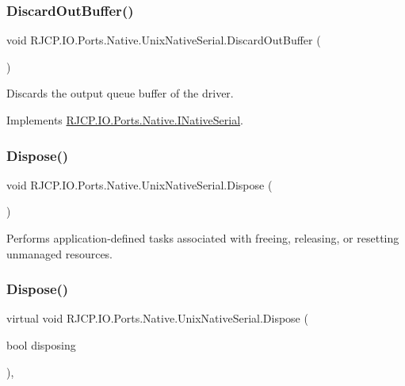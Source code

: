\subsubsection{\texorpdfstring{DiscardOutBuffer()}{DiscardOutBuffer()}}
{\footnotesize\ttfamily void R\+J\+C\+P.\+I\+O.\+Ports.\+Native.\+Unix\+Native\+Serial.\+Discard\+Out\+Buffer (\begin{DoxyParamCaption}{ }\end{DoxyParamCaption})}



Discards the output queue buffer of the driver. 



Implements \mbox{\hyperlink{interface_r_j_c_p_1_1_i_o_1_1_ports_1_1_native_1_1_i_native_serial_a1faafeb15779e3f998fd76601332ec8f}{R\+J\+C\+P.\+I\+O.\+Ports.\+Native.\+I\+Native\+Serial}}.

\mbox{\label{class_r_j_c_p_1_1_i_o_1_1_ports_1_1_native_1_1_unix_native_serial_a2d24f2b011e090360140a1b54db6b98d}} 
\subsubsection{\texorpdfstring{Dispose()}{Dispose()}\hspace{0.1cm}{\footnotesize\ttfamily [1/2]}}
{\footnotesize\ttfamily void R\+J\+C\+P.\+I\+O.\+Ports.\+Native.\+Unix\+Native\+Serial.\+Dispose (\begin{DoxyParamCaption}{ }\end{DoxyParamCaption})}



Performs application-\/defined tasks associated with freeing, releasing, or resetting unmanaged resources. 

\mbox{\label{class_r_j_c_p_1_1_i_o_1_1_ports_1_1_native_1_1_unix_native_serial_a9443132cdda093e01bc428f852e24afd}} 
\subsubsection{\texorpdfstring{Dispose()}{Dispose()}\hspace{0.1cm}{\footnotesize\ttfamily [2/2]}}
{\footnotesize\ttfamily virtual void R\+J\+C\+P.\+I\+O.\+Ports.\+Native.\+Unix\+Native\+Serial.\+Dispose (\begin{DoxyParamCaption}\item[{bool}]{disposing }\end{DoxyParamCaption})\hspace{0.3cm}{\ttfamily [protected]}, {\ttfamily [virtual]}}



